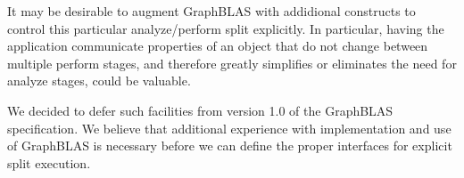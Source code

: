 It may be desirable to augment GraphBLAS with addidional constructs to control this particular
analyze/perform split explicitly. In particular, having the application communicate properties of
an object that do not change between multiple perform stages, and therefore greatly simplifies
or eliminates the need for analyze stages, could be valuable.

We decided to defer such facilities from version 1.0 of the GraphBLAS specification. We believe
that additional experience with implementation and use of GraphBLAS is necessary before
we can define the proper interfaces for explicit split execution.
